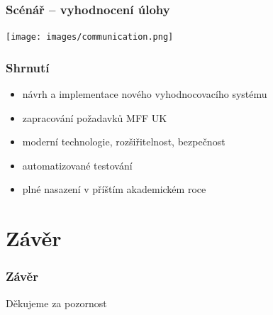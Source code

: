 \documentclass{beamer}
\begin{document}
\begin{frame}
	\frametitle{Scénář -- vyhodnocení úlohy}
	\begin{center}
		\texttt{[image: images/communication.png]}
	\end{center}
\end{frame}

\begin{frame}
	\frametitle{Shrnutí}
	\begin{itemize}
		\item návrh a implementace nového vyhodnocovacího systému
		\item zapracování požadavků MFF UK
		\item moderní technologie, rozšiřitelnost, bezpečnost
		\item automatizované testování
		\item plné nasazení v příštím akademickém roce
	\end{itemize}
\end{frame}

\section{Závěr}
\begin{frame}
	\frametitle{Závěr}
	\centering
	\LARGE{Děkujeme za pozornost}
\end{frame}
\end{document}

